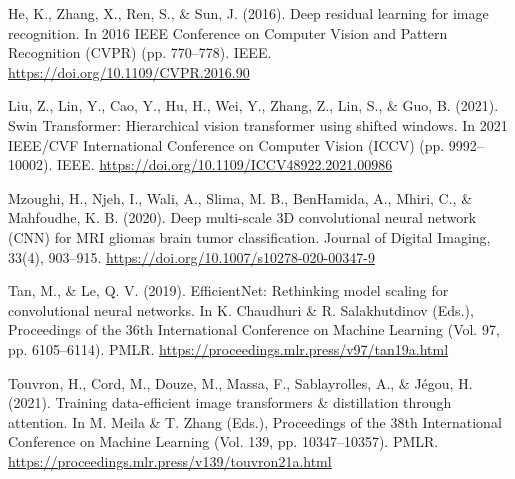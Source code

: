 \documentclass[11pt,letterpaper]{article}
\begin{document}
\clearpage
\begingroup
\renewcommand{\bibsection}{\section*{References}}
\begin{thebibliography}{}

He, K., Zhang, X., Ren, S., \& Sun, J. (2016). Deep residual learning for image recognition.
In 2016 IEEE Conference on Computer Vision and Pattern Recognition (CVPR) (pp. 770--778).
IEEE. \url{https://doi.org/10.1109/CVPR.2016.90}

Liu, Z., Lin, Y., Cao, Y., Hu, H., Wei, Y., Zhang, Z., Lin, S., \& Guo, B. (2021).
Swin Transformer: Hierarchical vision transformer using shifted windows.
In 2021 IEEE/CVF International Conference on Computer Vision (ICCV) (pp. 9992--10002).
IEEE. \url{https://doi.org/10.1109/ICCV48922.2021.00986}

Mzoughi, H., Njeh, I., Wali, A., Slima, M. B., BenHamida, A., Mhiri, C., \& Mahfoudhe, K. B. (2020).
Deep multi-scale 3D convolutional neural network (CNN) for MRI gliomas brain tumor classification.
Journal of Digital Imaging, 33(4), 903--915.
\url{https://doi.org/10.1007/s10278-020-00347-9}

Tan, M., \& Le, Q. V. (2019). EfficientNet: Rethinking model scaling for convolutional neural networks.
In K. Chaudhuri \& R. Salakhutdinov (Eds.), Proceedings of the 36th International Conference on Machine Learning
(Vol. 97, pp. 6105--6114). PMLR. \url{https://proceedings.mlr.press/v97/tan19a.html}

Touvron, H., Cord, M., Douze, M., Massa, F., Sablayrolles, A., \& J\'egou, H. (2021).
Training data-efficient image transformers \& distillation through attention.
In M. Meila \& T. Zhang (Eds.), Proceedings of the 38th International Conference on Machine Learning
(Vol. 139, pp. 10347--10357). PMLR. \url{https://proceedings.mlr.press/v139/touvron21a.html}

\end{thebibliography}
\endgroup
\end{document}
